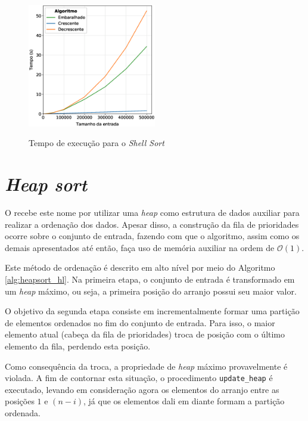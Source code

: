 \documentclass[12pt]{article}
\begin{document}
\begin{figure}[!h]%
    \centering
    {\includegraphics[width=0.5\textwidth]{shell} } \label{fig:shell_sort}
    \caption{Tempo de execução para o \textit{Shell Sort}}%
\end{figure}







\section{\textit{Heap sort}}

O  recebe este nome por utilizar uma \textit{heap} como estrutura de dados auxiliar para realizar a ordenação dos dados. Apesar disso, a construção da fila de prioridades ocorre sobre o conjunto de entrada, fazendo com que o algoritmo, assim como os demais apresentados até então, faça uso de memória auxiliar na ordem de $\mathcal{O}(1)$.

Este método de ordenação é descrito em alto nível por meio do Algoritmo \ref{alg:heapsort_hl}. Na primeira etapa, o conjunto de entrada é transformado em um \textit{heap} máximo, ou seja, a primeira posição do arranjo possui seu maior valor.

O objetivo da segunda etapa consiste em incrementalmente formar uma partição de elementos ordenados no fim do conjunto de entrada. Para isso, o maior elemento atual (cabeça da fila de prioridades) troca de posição com o último elemento da fila, perdendo esta posição.

Como consequência da troca, a propriedade de \textit{heap} máximo provavelmente é violada. A fim de contornar esta situação, o procedimento \texttt{update\_heap} é executado, levando em consideração agora os elementos do arranjo entre as posições $1$ e $(n-i)$, já que os elementos dali em diante formam a partição ordenada.
\end{document}

